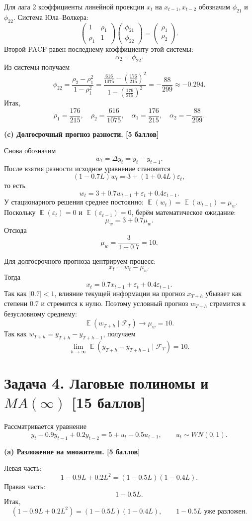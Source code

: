 \documentclass[12pt]{article}
\DeclareMathOperator{\E}{\mathbb{E}}
\newcommand \e{\varepsilon}
\newcommand{\cF}{\mathcal{F}}
\newcommand{\step}[1]{\medskip\noindent\textbf{#1}\par\nobreak\vspace{2pt}}
\begin{document}
Для лага 2 коэффициенты линейной проекции $x_t$ на $x_{t-1},x_{t-2}$ обозначим $\phi_{21}$ и $\phi_{22}$. Система Юла--Волкера:
\[
\begin{pmatrix}
1 & \rho_1\\
\rho_1 & 1
\end{pmatrix}
\begin{pmatrix}
\phi_{21}\\
\phi_{22}
\end{pmatrix}
=
\begin{pmatrix}
\rho_1\\
\rho_2
\end{pmatrix}.
\]
Второй PACF равен последнему коэффициенту этой системы:
\[
\alpha_2=\phi_{22}.
\]
Из системы получаем
\[
\phi_{22}
=\frac{\rho_2-\rho_1^2}{1-\rho_1^2}
=\frac{\frac{616}{1075}-\left(\frac{176}{215}\right)^2}
{1-\left(\frac{176}{215}\right)^2}
=-\frac{88}{299}\approx -0.294.
\]
Итак,
\[
\boxed{\rho_1=\frac{176}{215},\quad \rho_2=\frac{616}{1075},\quad
\alpha_1=\frac{176}{215},\quad \alpha_2=-\frac{88}{299}.}
\]

\step{(c) Долгосрочный прогноз разности. \hfill [5 баллов]}
Снова обозначим
\[
w_t=\Delta y_t=y_t-y_{t-1}.
\]
После взятия разности исходное уравнение становится
\[
(1-0.7L)w_t=3+(1+0.4L)\e_t,
\]
то есть
\[
w_t=3+0.7w_{t-1}+\e_t+0.4\e_{t-1}.
\]
У стационарного решения среднее постоянно: $\E(w_t)=\E(w_{t-1})=\mu_w$. Поскольку $\E(\e_t)=0$ и $\E(\e_{t-1})=0$, берём математическое ожидание:
\[
\mu_w=3+0.7\mu_w.
\]
Отсюда
\[
\mu_w=\frac{3}{1-0.7}=10.
\]

Для долгосрочного прогноза центрируем процесс:
\[
x_t=w_t-\mu_w.
\]
Тогда
\[
x_t=0.7x_{t-1}+\e_t+0.4\e_{t-1}.
\]
Так как $|0.7|<1$, влияние текущей информации на прогноз $x_{T+h}$ убывает как степени $0.7$ и стремится к нулю. Поэтому условный прогноз $w_{T+h}$ стремится к безусловному среднему:
\[
\E(w_{T+h}\mid\cF_T)\to \mu_w=10.
\]
Так как $w_{T+h}=y_{T+h}-y_{T+h-1}$, получаем
\[
\boxed{
\lim_{h\to\infty}\E(y_{T+h}-y_{T+h-1}\mid\cF_T)=10.
}
\]

\section*{Задача 4. Лаговые полиномы и $MA(\infty)$ \hfill [15 баллов]}

Рассматривается уравнение
\[
y_t-0.9y_{t-1}+0.2y_{t-2}=5+u_t-0.5u_{t-1},
\qquad u_t\sim WN(0,1).
\]

\step{(a) Разложение на множители. \hfill [5 баллов]}
Левая часть:
\[
1-0.9L+0.2L^2=(1-0.5L)(1-0.4L).
\]
Правая часть:
\[
1-0.5L.
\]
Итак,
\[
\boxed{(1-0.9L+0.2L^2)=(1-0.5L)(1-0.4L),\qquad
1-0.5L \text{ уже разложен.}}
\]
\end{document}
